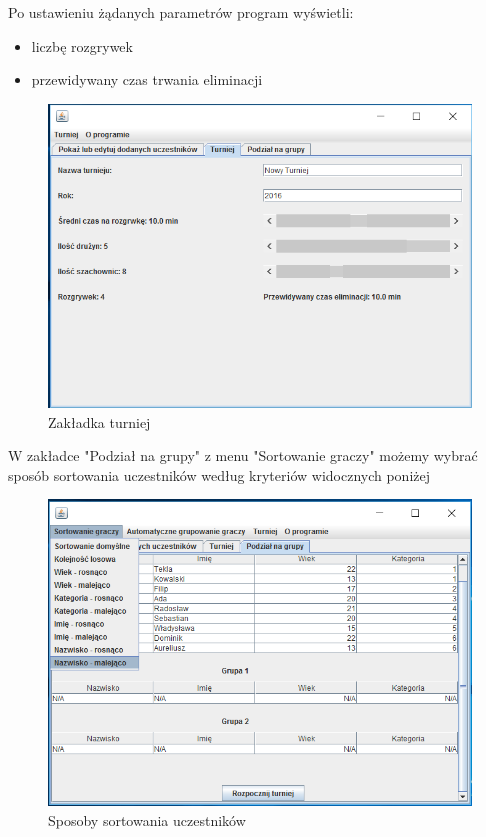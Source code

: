 Po ustawieniu żądanych parametrów program wyświetli:
\begin{itemize}
	\item liczbę rozgrywek
	\item przewidywany czas trwania eliminacji
\end{itemize}



\begin{figure}[H]
	\centering
	\includegraphics[width=15cm]{fig/7}
	\caption{Zakładka turniej}
	\label {fig:zakladka_turniej} 
\end{figure}
W zakładce "Podział na grupy" z menu "Sortowanie graczy" możemy wybrać sposób sortowania uczestników według kryteriów widocznych poniżej
\begin{figure}[H]
	\centering
	\includegraphics[width=15cm]{fig/8}
	\caption{Sposoby sortowania uczestników}
	\label {fig:Sposoby_sortowania_uczestnikow} 
\end{figure}
